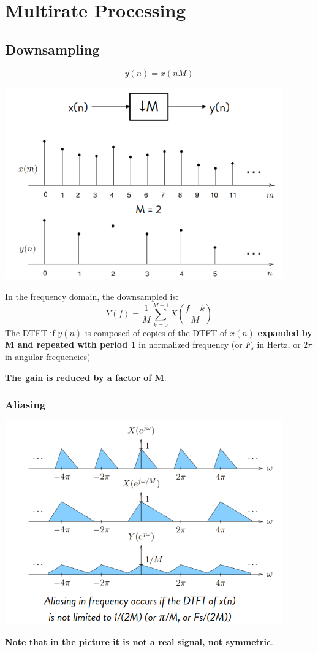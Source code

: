 
\section{Multirate Processing}
\subsection{Downsampling}
    \begin{LARGE}
        $$
        y(n)=x(nM)
        $$
    \end{LARGE}
    \begin{center}
        \includegraphics[width=0.9\textwidth]{images/downsampling.png}
    \end{center}
    In the frequency domain, the downsampled is:
    $$
    Y(f)=\frac{1}{M}\sum_{k=0}^{M-1}X\left(\frac{f-k}{M}\right)
    $$
    The DTFT if $y(n)$ is composed of copies of the DTFT of $x(n)$ \textbf{expanded by M and repeated with period 1} in normalized frequency (or $F_s$ in Hertz, or $2\pi$ in angular frequencies)

    \textbf{The gain is reduced by a factor of M}.
    \subsubsection{Aliasing}
    \begin{center}
        \includegraphics[width=0.9\textwidth]{images/downsampling_aliasing.png}
    \end{center}
    \textbf{Note that in the picture it is not a real signal, not symmetric}.


